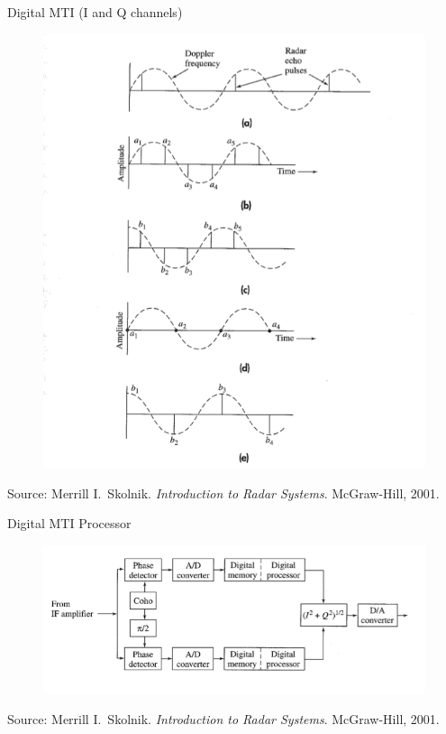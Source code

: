\documentclass[mathserif]{beamer}
\begin{document}
    


    \begin{frame}{Digital MTI (I and Q channels)}
      \begin{minipage}[t][0.8\textheight][t]{\textwidth}
 	\begin{figure}[h]
		\centering
		\includegraphics[height=0.7\textheight]{inq}
	\end{figure}
	\vfill
	\tiny{Source: Merrill I.~Skolnik. \emph{Introduction to Radar Systems}. McGraw-Hill, 2001.}
      \end{minipage}
    \end{frame}
    
    \begin{frame}{Digital MTI Processor}
      \begin{minipage}[t][0.8\textheight][t]{\textwidth}
	\begin{figure}[h]
		\centering
		\includegraphics[width=0.9\linewidth]{digitalMTIProcessor}
	\end{figure}
	\vfill
	\tiny{Source: Merrill I.~Skolnik. \emph{Introduction to Radar Systems}. McGraw-Hill, 2001.}
      \end{minipage}
    \end{frame}
    
\end{document}
